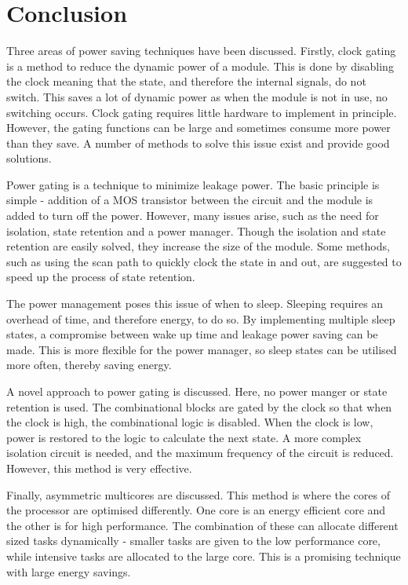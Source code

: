 
\section{Conclusion}

Three areas of power saving techniques have been discussed. 
Firstly, clock gating is a method to reduce the dynamic power of a module. 
This is done by disabling the clock meaning that the state, and therefore the internal signals, do not switch. 
This saves a lot of dynamic power as when the module is not in use, no switching occurs. 
Clock gating requires little hardware to implement in principle. 
However, the gating functions can be large and sometimes consume more power than they save. 
A number of methods to solve this issue exist and provide good solutions.


Power gating is a technique to minimize leakage power.
The basic principle is simple - addition of a MOS transistor between the circuit and the module is added to turn off the power.
However, many issues arise, such as the need for isolation, state retention and a power manager.
Though the isolation and state retention are easily solved, they increase the size of the module. 
Some methods, such as using the scan path to quickly clock the state in and out, are suggested to speed up the process of state retention. 

The power management poses this issue of when to sleep. 
Sleeping requires an overhead of time, and therefore energy, to do so. 
By implementing multiple sleep states, a compromise between wake up time and leakage power saving can be made. 
This is more flexible for the power manager, so sleep states can be utilised more often, thereby saving energy.

A novel approach to power gating is discussed. 
Here, no power manger or state retention is used. 
The combinational blocks are gated by the clock so that when the clock is high, the combinational logic is disabled. 
When the clock is low, power is restored to the logic to calculate the next state. 
A more complex isolation circuit is needed, and the maximum frequency of the circuit is reduced. 
However, this method is very effective.

Finally, asymmetric multicores are discussed.
This method is where the cores of the processor are optimised differently.
One core is an energy efficient core and the other is for high performance. 
The combination of these can allocate different sized tasks dynamically - smaller tasks are given to the low performance core, while intensive tasks are allocated to the large core.
This is a promising technique with large energy savings.

